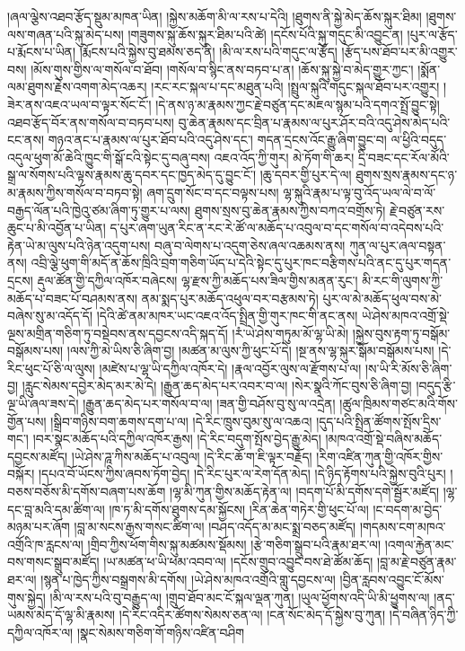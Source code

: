 \documentclass{article}
\begin{document}
།ཞལ་ལྕེས་འཐབ་རྩོད་སྡུམ་མཁན་ཡིན། །སྐྱེས་མཆོག་མི་ལ་རས་པ་དེའི། །ཐུགས་ནི་སྐྱེ་མེད་ཆོས་སྐུར་ཐིམ། །ཐུགས་ལས་གཞན་པའི་སྐུ་མེད་པས། །གཟུགས་སྐུ་ཆོས་སྐུར་ཐིམ་པའི་ཚེ། །དངོས་པོའི་སྐུ་གདུང་མི་འབྱུང་ན། །པུར་ལ་རྩོད་པ་རྨོངས་པ་ཡིན། །རྨོངས་པའི་སྐྱེས་བུ་ཐམས་ཅད་ནི། །མི་ལ་རས་པའི་གདུང་ལ་རྩོད། །རྩོད་པས་ཐོབ་པར་མི་འགྱུར་བས། །མོས་གུས་གྱིས་ལ་གསོལ་བ་ཐོབ། །གསོལ་བ་སྙིང་ནས་བཏབ་པ་ན། །ཆོས་སྐུ་སྐྱེ་བ་མེད་གྱུར་ཀྱང་། །སྨོན་ལམ་ཐུགས་རྗེས་འགག་མེད་འཆར། །རང་རང་སྐལ་པ་དང་མཐུན་པའི། །སྤྲུལ་སྐུའི་གདུང་སྐལ་ཐོབ་པར་འགྱུར། །ཟེར་ནས་འཇའ་ཡལ་བ་ལྟར་སོང་ངོ་། །དེ་ནས་ཉ་མ་རྣམས་ཀྱང་རྗེ་བཙུན་དང་མཇལ་སྙམ་པའི་དགའ་སྤྲོ་བྱུང་སྟེ། འཐབ་རྩོད་བོར་ནས་གསོལ་བ་བཏབ་པས། བུ་ཆེན་རྣམས་དང་བྲིན་པ་རྣམས་ལ་པུར་ཤོར་བའི་འདུ་ཤེས་མེད་པའི་ངང་ནས། གཉའ་ནང་པ་རྣམས་ལ་པུར་ཐོབ་པའི་འདུ་ཤེས་དང་། གདན་དྲངས་འོང་རྒྱུ་ཞིག་བྱུང་བ། ལ་ཕྱིའི་བདུད་འདུལ་ཕུག་མོ་ཆེའི་ཁྱུང་གི་སྒོ་ངའི་སྟེང་དུ་བཞུ་བས། འཇའ་འོད་ཀྱི་གུར། མེ་ཏོག་གི་ཆར། དྲི་བཟང་དང་རོལ་མོའི་སྒྲ་ལ་སོགས་པའི་ལྟས་རྣམས་ཆུ་དབར་དང་ཁྱད་མེད་དུ་བྱུང་ངོ་། །ཆུ་དབར་གྱི་པུར་དེ་ལ། ཐུགས་སྲས་རྣམས་དང་ཉ་མ་རྣམས་ཀྱིས་གསོལ་བ་བཏབ་སྟེ། ཞག་དྲུག་སོང་བ་དང་བལྟས་པས། ལྷ་སྐུའི་རྣམ་པ་ལྟ་བུ་འོད་ཡལ་ལེ་བ་ལོ་བརྒྱད་ལོན་པའི་ཁྱེའུ་ཙམ་ཞིག་ཏུ་གྱུར་པ་ལས། ཐུགས་སྲས་བུ་ཆེན་རྣམས་ཀྱིས་བཀའ་བགྲོས་ཏེ། རྗེ་བཙུན་རས་ཆུང་པ་མི་འབྱོན་པ་ཡིན། ད་པུར་ཞག་ཡུན་རིང་ན་རང་རེ་ཚོ་ལ་མཆོད་པ་འབུལ་བ་དང་གསོལ་བ་འདེབས་པའི་རྟེན་ཡེ་མ་ལུས་པའི་ཉེན་འདུག་པས། བཞུ་བ་ལེགས་པ་འདུག་ཅེས་ཞལ་འཆམས་ནས། ཀུན་ལ་པུར་ཞལ་བསྟན་ནས། འབྲི་ལྕེ་ཕུག་གི་མདོ་ན་ཆོས་ཁྲིའི་བྲག་གཅིག་ཡོད་པ་དེའི་སྟེང་དུ་པུར་ཁང་བརྩིགས་པའི་ནང་དུ་པུར་གདན་དྲངས། རྡུལ་ཚོན་གྱི་དཀྱིལ་འཁོར་བཞེངས། ལྷ་རྫས་ཀྱི་མཆོད་པས་ཟིལ་གྱིས་མནན་རུང་། མི་རང་གི་ལུགས་ཀྱི་མཆོད་པ་བཟང་པོ་བཤམས་ནས། ནམ་སྨད་པུར་མཆོད་འཕུལ་བར་བརྩམས་ཏེ། པུར་ལ་མེ་མཆོད་ཕུལ་བས་མེ་བཞེས་སུ་མ་འདོད་དོ། །དེའི་ཚེ་ནམ་མཁར་ཡང་འཇའ་འོད་སྤྲིན་གྱི་གུར་ཁང་གི་ནང་ནས། ཡེ་ཤེས་མཁའ་འགྲོ་སྡེ་ལྔས་མགྲིན་གཅིག་ཏུ་བསྡེབས་ནས་དབྱངས་འདི་སྐད་དོ། །རཾ་ཡེ་ཤེས་གཏུམ་མོ་ལྷ་ཡི་མེ། །སྐྱེས་བུས་རྟག་ཏུ་བསྒོམ་བསྒོམས་པས། །ལས་ཀྱི་མེ་ཡིས་ཅི་ཞིག་བྱ། །མཚན་མ་ལུས་ཀྱི་ཕུང་པོ་དེ། །སྔ་ནས་ལྷ་སྐུར་སྒོམ་བསྒོམས་པས། །དེ་རིང་ཕུང་པོ་ཅི་ལ་ལུས། །མཛེས་པ་ལྷ་ཡི་དཀྱིལ་འཁོར་དེ། །རྣལ་འབྱོར་ལུས་ལ་རྫོགས་པ་ལ། །ས་ཡི་རི་མོས་ཅི་ཞིག་བྱ། །རླུང་སེམས་དབྱེར་མེད་མར་མེ་དེ། །རྒྱུན་ཆད་མེད་པར་འབར་བ་ལ། །སེར་སྣའི་ཀོང་བུས་ཅི་ཞིག་བྱ། །བདུད་རྩི་ལྔ་ཡི་ཞལ་ཟས་དེ། །རྒྱུན་ཆད་མེད་པར་གསོལ་བ་ལ། །ཟན་གྱི་བཤོས་བུ་སུ་ལ་འདྲེན། །ཚུལ་ཁྲིམས་གཙང་མའི་གོས་གྱོན་པས། །སྒྲིབ་གཉིས་བག་ཆགས་དག་པ་ལ། །དེ་རིང་ཁྲུས་བུམ་སུ་ལ་འཆའ། །དུད་པའི་སྤྲིན་ཚོགས་སྤོས་དྲིས་གང་། །བར་སྣང་མཆོད་པའི་དཀྱིལ་འཁོར་རྒྱས། །དེ་རིང་བདུག་སྤོས་བྱེད་རྒྱུ་མེད། །མཁའ་འགྲོ་སྡེ་བཞིས་མཆོད་དབྱངས་མཛོད། །ཡེ་ཤེས་ཌཱ་ཀིས་མཆོད་པ་འབུལ། །དེ་རིང་ཆོ་ག་ཇི་ལྟར་བརྗོད། །རིག་འཛིན་ཀུན་གྱི་འཁོར་གྱིས་བསྐོར། །དཔའ་བོ་ཡོངས་ཀྱིས་ཞབས་ཏོག་བྱེད། །དེ་རིང་པུར་ལ་རེག་དོན་མེད། །དེ་ཉིད་རྟོགས་པའི་སྐྱེས་བུའི་པུར། །བཅས་བཅོས་མི་དགོས་བཞག་པས་ཆོག །ལྷ་མི་ཀུན་གྱིས་མཆོད་རྟེན་ལ། །བདག་པོ་མི་དགོས་དགེ་སྦྱོར་མཛོད། །ལྷ་དང་བླ་མའི་དམ་ཚིག་ལ། །ཁ་ཏ་མི་དགོས་ཐུགས་དམ་སྐྱོངས། །རིན་ཆེན་གཏེར་གྱི་ཕུང་པོ་ལ། །ང་བདག་མ་བྱེད་མཉམ་པར་ཞོག །བླ་མ་སངས་རྒྱས་གསང་ཚིག་ལ། །བཤད་འདོད་མ་མང་སྨྲ་བཅད་མཛོད། །གདམས་ངག་མཁའ་འགྲོའི་ཁ་རླངས་ལ། །གྲིབ་ཀྱིས་ཕོག་གིས་སྐུ་མཚམས་སྡོམས། །རྩེ་གཅིག་སྒྲུབ་པའི་རྣམ་ཐར་ལ། །འགལ་རྐྱེན་མང་བས་གསང་སྒྲུབ་མཛོད། །ཡ་མཚན་ཕ་ཡི་ཕམ་འབབ་ལ། །དངོས་གྲུབ་འབྱུང་བས་ཐེ་ཚོམ་ཆོད། །བླ་མ་རྗེ་བཙུན་རྣམ་ཐར་ལ། །སྙན་པ་ཁྱེད་ཀྱིས་བསྒྲགས་མི་དགོས། །ཡེ་ཤེས་མཁའ་འགྲོའི་གླུ་དབྱངས་ལ། །བྱིན་རླབས་འབྱུང་ངོ་མོས་གུས་སྐྱེད། །མི་ལ་རས་པའི་བུ་བརྒྱུད་ལ། །གྲུབ་ཐོབ་མང་ངོ་སྐལ་ལྡན་ཀུན། །ཡུལ་ཕྱོགས་འདི་ཡི་མི་ཕྱུགས་ལ། །ནད་ཡམས་མེད་དོ་ལྷ་མི་རྣམས། །དེ་རིང་འདིར་ཚོགས་སེམས་ཅན་ལ། །ངན་སོང་མེད་དོ་སྐྱེས་བུ་ཀུན། །དེ་བཞིན་ཉིད་ཀྱི་དཀྱིལ་འཁོར་ལ། །སྣང་སེམས་གཅིག་གོ་གཉིས་འཛིན་བཤིག 
\end{document}
